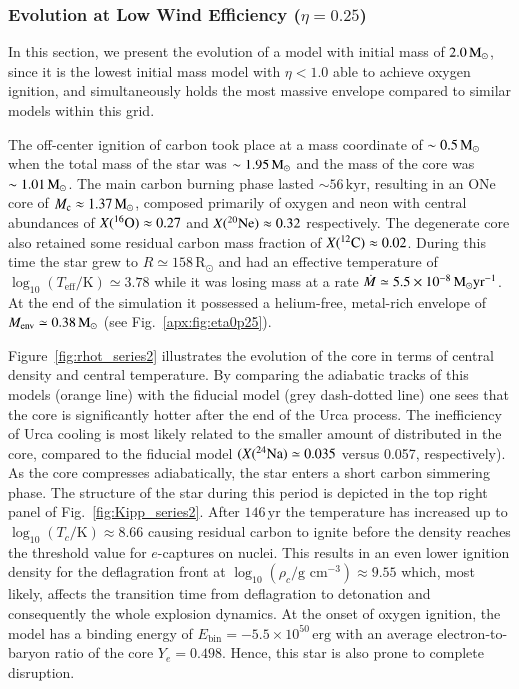 \documentclass[main.tex]{subfiles}
\begin{document}
\subsubsection{Evolution at Low Wind Efficiency ($\eta = 0.25$)}\label{sec:eta_0p25_evolution}
In this section, we present the evolution of a \seriestwo model with initial mass of $2.0\msun$, since it is the lowest initial mass model with $\eta < 1.0$ able to achieve oxygen ignition, and simultaneously holds the most massive envelope compared to similar models within this grid.

The off-center ignition of carbon took place at a mass coordinate of $\sim 0.5\msun$ when the total mass of the star was $\sim 1.95\msun$ and the mass of the core was $\sim 1.01\msun$. The main carbon burning phase lasted $\sim 56\,\text{kyr}$, resulting in an ONe core of $M_{\rm c} \approx 1.37\msun$, composed primarily of oxygen and neon with central abundances of $X(\iso{O}{16}) \approx 0.27$ and $X(\iso{Ne}{20}) \approx 0.32$ respectively. The degenerate core also retained some residual carbon mass fraction of $X(\iso{C}{12}) \approx 0.02$. During this time the star grew to $R \simeq 158$\,R$_\odot$ and had an effective temperature of $\log_{10} (T_{\text{eff}} / \text{K}) \simeq 3.78$ while it was losing mass at a rate $\dot{M} \simeq 5.5 \times 10^{-8}\msun \text{yr}^{-1}$. At the end of the simulation it possessed a helium-free, metal-rich envelope of $M_{\text{env}} \simeq 0.38\msun$  (see Fig.~\ref{apx:fig:eta0p25}).

Figure~\ref{fig:rhot_series2} illustrates the evolution of the core in 
terms of central density and central temperature. By comparing the 
adiabatic tracks of this models (orange line) with the \seriesone 
fiducial model (grey dash-dotted line) one sees that the core is 
significantly hotter after the end of the Urca process. The 
inefficiency of Urca cooling is most likely related to the smaller amount of  distributed in the core, compared to the \seriesone fiducial model $(X(\iso{Na}{24}) \simeq 0.035$ versus 0.057,  respectively).
As the core compresses adiabatically, the star enters a short carbon simmering phase. 
The structure of the star during this period is depicted in the top 
right panel of Fig.~\ref{fig:Kipp_series2}. After $146\,\text{yr}$ 
the temperature has increased up to $\log_{10} (T_c / \text{K}) \approx 8.66$ causing  residual carbon to ignite before the density reaches the threshold value for $e$-captures on  nuclei. This results in an even lower ignition density for the deflagration front at $\log_{10} (\rho_c / \text{g cm}^{-3}) \approx 9.55$ which, most likely,  affects the transition time from deflagration to detonation and consequently the whole explosion dynamics. At the onset of oxygen ignition, the model has a binding energy of $E_{\text{bin}} = - 5.5 \times 10^{50}\,\text{erg}$ with an average electron-to-baryon ratio of the core $Y_e = 0.498$. Hence, this star is also prone to complete disruption. 
\end{document}

